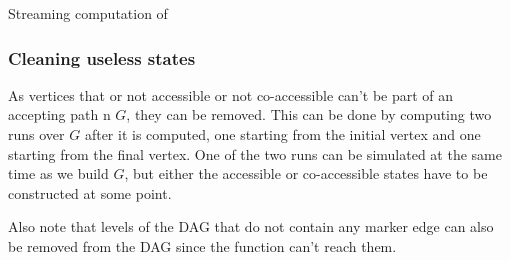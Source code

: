 \documentclass[12px]{article}
\theoremstyle{definition}
\begin{document}
        \begin{algorithm}[H]
          \caption{Streaming computation of }%
          \label{alg:build_jl}
          \begin{algorithmic}[1]
              \EndIf{}
            \EndFor{}
                  \EndIf{}
                \EndFor{}
                \State{}
              \EndFor{}
            \EndFor{}
          \end{algorithmic}
        \end{algorithm}

      \subsubsection{Cleaning useless states}

        As vertices that or not accessible or not co-accessible can't be part
        of an accepting path n $G$, they can be removed. This can be done by
        computing two runs over $G$ after it is computed, one starting from the
        initial vertex and one starting from the final vertex. One of the two
        runs can be simulated at the same time as we build $G$, but either the
        accessible or co-accessible states have to be constructed at some
        point.

        Also note that levels of the DAG that do not contain any marker edge
        can also be removed from the DAG since the  function
        can't reach them.
\end{document}
